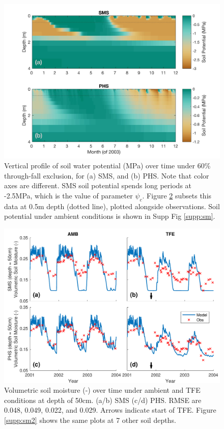\documentclass[draft,linenumbers]{agujournal}
\begin{document}
  
      \clearpage
    \begin{figure}[h]
     \centering
     \includegraphics[width=30pc]{../figs3/smp.jpg}
     \caption{Vertical profile of soil water potential (MPa) over time under 60\% through-fall exclusion, for
     (a) SMS, and 
     (b) PHS.
     Note that color axes are different.
     SMS soil potential spends long periods at -2.5MPa, which is the value of parameter $\psi_c$.
     Figure \ref{fig:sm2} subsets this data at 0.5m depth (dotted line), plotted alongside observations.
     Soil potential under ambient conditions is shown in Supp Fig \ref{supp:sm}.
 }
     \label{fig:sm}
  \end{figure}
  
        \clearpage
    \begin{figure}[h]
     \centering
     \includegraphics[width=30pc]{../figs3/sm2.pdf}
     \caption{Volumetric soil moisture (-) over time under ambient and TFE conditions at depth of 50cm.
     (a/b) SMS
     (c/d) PHS.
     RMSE are 0.048, 0.049, 0.022, and 0.029.
     Arrows indicate start of TFE. Figure \ref{supp:sm2} shows the same plots at 7 other soil depths. }
     \label{fig:sm2}
  \end{figure}
\end{document}
